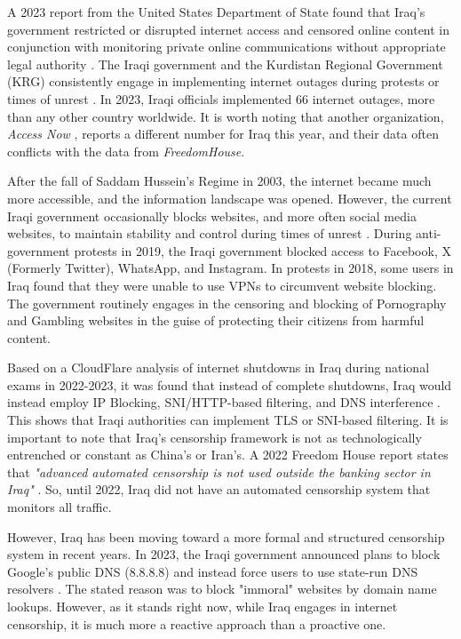 A 2023 report from the United States Department of State found that Iraq's government restricted or disrupted internet access and censored online content in conjunction with monitoring private online communications without appropriate legal authority \cite{USDoSIraq2023}. The Iraqi government and the Kurdistan Regional Government (KRG) consistently engage in implementing internet outages during protests or times of unrest \cite{freedomhouseIraqFreedom}. In 2023, Iraqi officials implemented 66 internet outages, more than any other country worldwide. It is worth noting that another organization, \textit{Access Now} \cite{accessnowBlackoutReport2023}, reports a different number for Iraq this year, and their data often conflicts with the data from \textit{FreedomHouse}.  

After the fall of Saddam Hussein's Regime in 2003, the internet became much more accessible, and the information landscape was opened. However, the current Iraqi government occasionally blocks websites, and more often social media websites, to maintain stability and control during times of unrest \cite{freedomhouseIraqFreedom}. During anti-government protests in 2019, the Iraqi government blocked access to Facebook, X (Formerly Twitter), WhatsApp, and Instagram. In protests in 2018, some users in Iraq found that they were unable to use VPNs to circumvent website blocking. The government routinely engages in the censoring and blocking of Pornography and Gambling websites in the guise of protecting their citizens from harmful content. 

Based on a CloudFlare analysis of internet shutdowns in Iraq during national exams in 2022-2023, it was found that instead of complete shutdowns, Iraq would instead employ IP Blocking, SNI/HTTP-based filtering, and DNS interference \cite{CloudFlareIraqExamShutdown}. This shows that Iraqi authorities can implement TLS or SNI-based filtering. It is important to note that Iraq's censorship framework is not as technologically entrenched or constant as China's or Iran's. A 2022 Freedom House report states that \textit{"advanced automated censorship is not used outside the banking sector in Iraq"} \cite{freedomhouseIraqFreedom}. So, until 2022, Iraq did not have an automated censorship system that monitors all traffic. 

However, Iraq has been moving toward a more formal and structured censorship system in recent years. In 2023, the Iraqi government announced plans to block Google's public DNS (8.8.8.8) and instead force users to use state-run DNS resolvers \cite{smexGooglesDNSIraq}. The stated reason was to block "immoral" websites by domain name lookups. However, as it stands right now, while Iraq engages in internet censorship, it is much more a reactive approach than a proactive one. 

